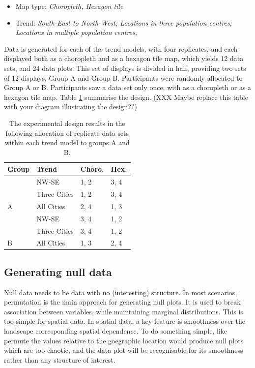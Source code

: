 \documentclass[conference,final,]{IEEEtran}
\providecommand{\tightlist}{%
  \setlength{\itemsep}{0pt}\setlength{\parskip}{0pt}}
\begin{document}
\begin{itemize}
\tightlist
\item
  Map type: \emph{Choropleth, Hexagon tile}
\item
  Trend: \emph{South-East to North-West; Locations in three population centres; Locations in multiple population centres, }
\end{itemize}

Data is generated for each of the trend models, with four replicates, and each displayed both as a choropleth and as a hexagon tile map, which yields 12 data sets, and 24 data plots. This set of displays is divided in half, providing two sets of 12 displays, Group A and Group B. Participants were randomly allocated to Group A or B. Participants saw a data set only once, with as a choropleth or as a hexagon tile map. Table \ref{tab:exp-design} summarise the design. (XXX Maybe replace this table with your diagram illustrating the design??)

\begin{table}

\caption{\label{tab:exp-design}The experimental design results in the following allocation of replicate data sets within each trend model to groups A and B.}
\centering
\begin{tabular}[t]{llll}
\toprule
Group & Trend & Choro. & Hex.\\
\midrule
 & NW-SE & 1, 2 & 3, 4\\
\cmidrule{2-4}
 & Three Cities & 1, 2 & 3, 4\\
\cmidrule{2-4}
\multirow{-3}{*}{\raggedright\arraybackslash A} & All Cities & 2, 4 & 1, 3\\
\cmidrule{1-4}
 & NW-SE & 3, 4 & 1, 2\\
\cmidrule{2-4}
 & Three Cities & 3, 4 & 1, 2\\
\cmidrule{2-4}
\multirow{-3}{*}{\raggedright\arraybackslash B} & All Cities & 1, 3 & 2, 4\\
\bottomrule
\end{tabular}
\end{table}

\hypertarget{generating-null-data}{%
\subsection{Generating null data}\label{generating-null-data}}

Null data needs to be data with no (interesting) structure. In most scenarios, permutation is the main approach for generating null plots. It is used to break association between variables, while maintaining marginal distributions. This is too simple for spatial data. In spatial data, a key feature is smoothness over the landscape corresponding spatial dependence. To do something simple, like permute the values relative to the goegraphic location would produce null plots which are too chaotic, and the data plot will be recognisable for its smoothness rather than any structure of interest.
\end{document}
